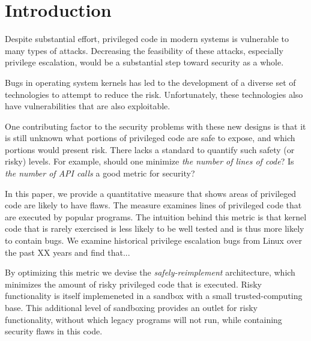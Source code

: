 \section{Introduction}
\label{sec.introduction}

Despite substantial effort, privileged code in modern systems is vulnerable 
to many types of attacks.  
Decreasing the feasibility of these attacks, especially privilege escalation, 
would be a substantial step toward security as a whole.

Bugs in operating system kernels has led to the development of a diverse set of
technologies to attempt to reduce the risk.    Unfortunately, these technologies also 
have vulnerabilities that are also exploitable.

One contributing factor to the security problems with these new designs is
that it is still unknown what portions of privileged code are
safe to expose, and which portions would present risk. There lacks a standard 
to quantify such safety (or risky) levels. For example, should one minimize 
\textit{the number of lines of code}?   Is \textit{the number of API 
calls} a good metric for security?    

In this paper, we provide a quantitative measure that shows
areas of privileged code are likely to have flaws.  
The measure examines lines of privileged code that are executed by popular 
programs.  The intuition behind this metric is that kernel code that is rarely
exercised is less likely to be well tested and is thus more likely to contain
bugs.  We examine historical privilege escalation bugs from Linux over
the past XX years and find that...

By optimizing this metric   we devise the \emph{safely-reimplement}
architecture, which minimizes the amount of risky privileged code that is
executed.  
Risky functionality is itself implemeneted in a sandbox with
a small trusted-computing base.  
This additional level of sandboxing 
provides an outlet for risky functionality, without which legacy programs
will not run, while containing security flaws in this code.  

